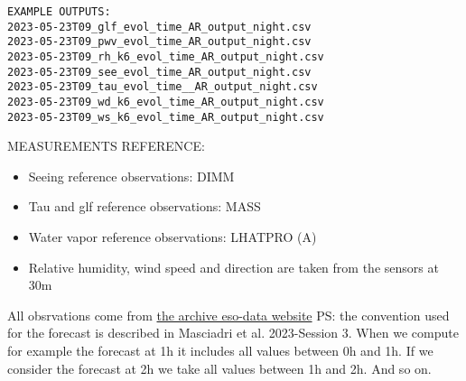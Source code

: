 \begin{verbatim}
EXAMPLE OUTPUTS:
2023-05-23T09_glf_evol_time_AR_output_night.csv
2023-05-23T09_pwv_evol_time_AR_output_night.csv
2023-05-23T09_rh_k6_evol_time_AR_output_night.csv
2023-05-23T09_see_evol_time_AR_output_night.csv
2023-05-23T09_tau_evol_time__AR_output_night.csv
2023-05-23T09_wd_k6_evol_time_AR_output_night.csv
2023-05-23T09_ws_k6_evol_time_AR_output_night.csv
\end{verbatim}
MEASUREMENTS REFERENCE:
\begin{itemize}
\item Seeing reference observations: DIMM
\item Tau and glf reference observations: MASS
\item Water vapor reference observations: LHATPRO (A)
\item Relative humidity, wind speed and direction are taken from the sensors at 30m
\end{itemize}
All obsrvations come from \href{http://archive.eso.org/cms/eso-data/ambient-conditions/paranal-ambient-query-forms.html}{the archive eso-data website}
%
PS: the convention used for the forecast is described in Masciadri et al. 2023-Session 3. When we compute for example the forecast at 1h it includes all values between 0h and 1h. If we consider the forecast at 2h we take all values between 1h and 2h. And so on.
%

